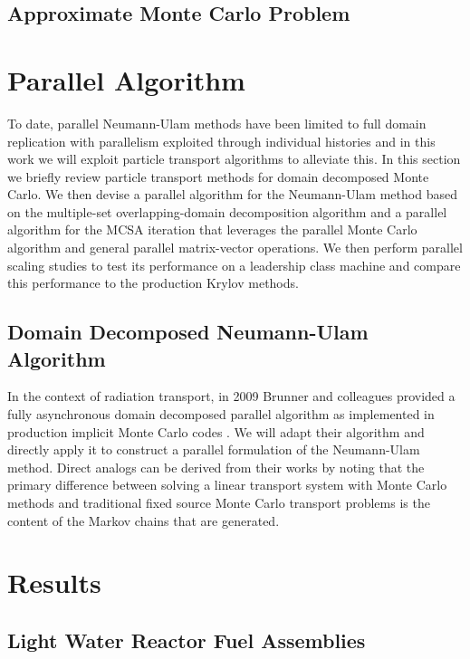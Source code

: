 \documentclass[letterpaper,11pt]{article}
\begin{document}
\subsection{Approximate Monte Carlo Problem}

\section{Parallel Algorithm}
\label{sec:parallel_mcsa}
To date, parallel Neumann-Ulam methods have been limited to full
domain replication with parallelism exploited through individual
histories \cite{alexandrov_efficient_1998} and in this work we will
exploit particle transport algorithms to alleviate this. In this
section we briefly review particle transport methods for domain
decomposed Monte Carlo. We then devise a parallel algorithm for the
Neumann-Ulam method based on the multiple-set overlapping-domain
decomposition algorithm and a parallel algorithm for the MCSA
iteration that leverages the parallel Monte Carlo algorithm and
general parallel matrix-vector operations. We then perform parallel
scaling studies to test its performance on a leadership class machine
and compare this performance to the production Krylov methods.

\subsection{Domain Decomposed Neumann-Ulam Algorithm}
\label{subsec:asynchronous_algorithm}
In the context of radiation transport, in 2009 Brunner and colleagues
provided a fully asynchronous domain decomposed parallel algorithm as
implemented in production implicit Monte Carlo codes
\cite{brunner_efficient_2009}. We will adapt their algorithm and
directly apply it to construct a parallel formulation of the
Neumann-Ulam method. Direct analogs can be derived from their works by
noting that the primary difference between solving a linear transport
system with Monte Carlo methods and traditional fixed source Monte
Carlo transport problems is the content of the Markov chains that are
generated.

\section{Results}

\subsection{Light Water Reactor Fuel Assemblies}
\end{document}
